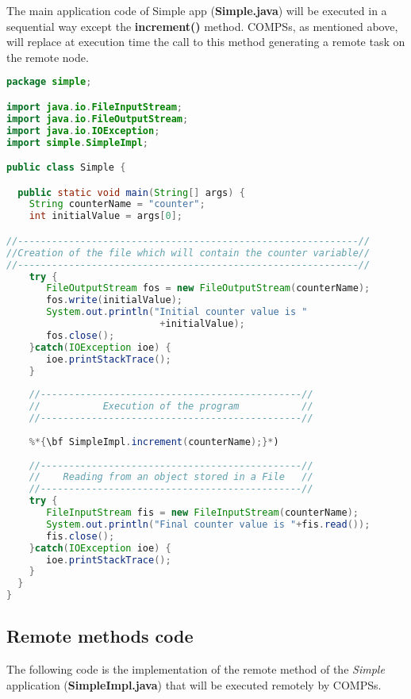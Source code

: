 The main application code of Simple app ({\bf Simple.java}) will be executed in a sequential way except the
{\bf increment()} method. COMPSs, as mentioned above, will replace at execution time the call to this method
generating a remote task on the remote node.

\begin{lstlisting}[language=java]
package simple;

import java.io.FileInputStream;
import java.io.FileOutputStream;
import java.io.IOException;
import simple.SimpleImpl;

public class Simple {

  public static void main(String[] args) {
    String counterName = "counter";
    int initialValue = args[0];

//------------------------------------------------------------//
//Creation of the file which will contain the counter variable//
//------------------------------------------------------------//
    try {
       FileOutputStream fos = new FileOutputStream(counterName);
       fos.write(initialValue);
       System.out.println("Initial counter value is "
                           +initialValue);
       fos.close();
    }catch(IOException ioe) {
       ioe.printStackTrace();
    }
    
    //----------------------------------------------//
    //           Execution of the program           //
    //----------------------------------------------//
    
    %*{\bf SimpleImpl.increment(counterName);}*)
    
    //----------------------------------------------//
    //    Reading from an object stored in a File   //
    //----------------------------------------------//
    try {
       FileInputStream fis = new FileInputStream(counterName);
       System.out.println("Final counter value is "+fis.read());
       fis.close();
    }catch(IOException ioe) {
       ioe.printStackTrace();
    }
  }
}
\end{lstlisting}


\subsection{Remote methods code}

The following code is the implementation of the remote method of the {\it Simple} application ({\bf SimpleImpl.java})
that will be executed remotely by COMPSs.

